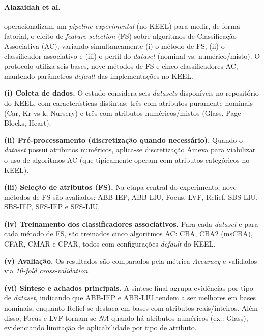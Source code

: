\paragraph*{Alazaidah et al.} 

 operacionalizam um \textit{pipeline experimental} (no KEEL) para medir, de forma fatorial, o efeito de \textit{feature selection} (FS) sobre algoritmos de Classificação Associativa (AC), variando simultaneamente (i) o método de FS, (ii) o classificador associativo e (iii) o perfil do \textit{dataset} (nominal vs. numérico/misto). O protocolo utiliza seis bases, nove métodos de FS e cinco classificadores AC, mantendo parâmetros \textit{default} das implementações no KEEL. 

\textbf{(i) Coleta de dados.}
O estudo considera seis \textit{datasets} disponíveis no repositório do KEEL, com características distintas: três com atributos puramente nominais (Car, Kr-vs-k, Nursery) e três com atributos numéricos/mistos (Glass, Page Blocks, Heart). 

\textbf{(ii) Pré-processamento (discretização quando necessário).}
Quando o \textit{dataset} possui atributos numéricos, aplica-se discretização Ameva para viabilizar o uso de algoritmos AC (que tipicamente operam com atributos categóricos no KEEL). 

\textbf{(iii) Seleção de atributos (FS).}
Na etapa central do experimento, nove métodos de FS são avaliados: ABB-IEP, ABB-LIU, Focus, LVF, Relief, SBS-LIU, SBS-IEP, SFS-IEP e SFS-LIU. 

\textbf{(iv) Treinamento dos classificadores associativos.}
Para cada \textit{dataset} e para cada método de FS, são treinados cinco algoritmos AC: CBA, CBA2 (msCBA), CFAR, CMAR e CPAR, todos com configurações \textit{default} do KEEL. 

\textbf{(v) Avaliação.}
Os resultados são comparados pela métrica \textit{Accuracy} e validados via \textit{10-fold cross-validation}. 

\textbf{(vi) Síntese e achados principais.}
A síntese final agrupa evidências por tipo de \textit{dataset}, indicando que ABB-IEP e ABB-LIU tendem a ser melhores em bases nominais, enquanto Relief se destaca em bases com atributos reais/inteiros. Além disso, Focus e LVF tornam-se \textit{NA} quando há atributos numéricos (ex.: Glass), evidenciando limitação de aplicabilidade por tipo de atributo. 


